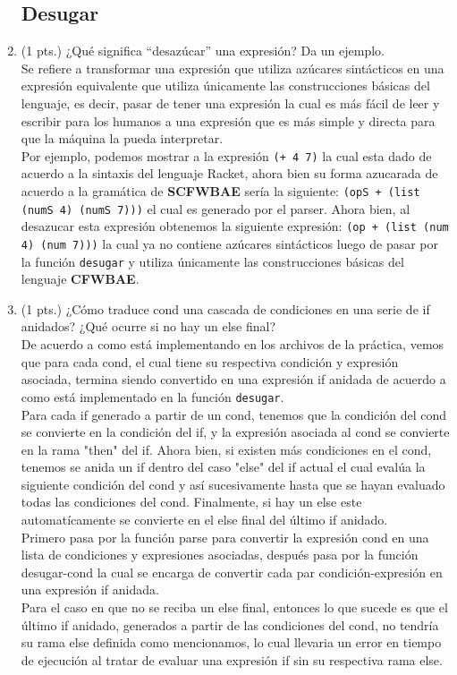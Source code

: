 \documentclass[11pt]{article}
\begin{document}
\begin{enumerate}
    \subsection{Desugar}
    \item (1 pts.) ¿Qué significa “desazúcar” una expresión? Da un ejemplo.\\
    Se refiere a transformar una expresión que utiliza azúcares sintácticos en una expresión equivalente que utiliza únicamente las construcciones básicas del lenguaje, es decir, pasar de tener una expresión la cual es más fácil de leer y escribir para los humanos a una expresión que es más simple y directa para que la máquina la pueda interpretar.\\
    Por ejemplo, podemos mostrar a la expresión \texttt{(+ 4 7)} la cual esta dado de acuerdo a la sintaxis del lenguaje Racket, ahora bien su forma azucarada de acuerdo a la gramática de \textbf{SCFWBAE} sería la siguiente: \texttt{(opS + (list (numS 4) (numS 7)))} el cual es generado por el parser. Ahora bien, al desazucar esta expresión obtenemos la siguiente expresión: \texttt{(op + (list (num 4) (num 7)))} la cual ya no contiene azúcares sintácticos luego de pasar por la función \texttt{desugar} y utiliza únicamente las construcciones básicas del lenguaje \textbf{CFWBAE}. 

    \item (1 pts.) ¿Cómo traduce cond una cascada de condiciones en una serie de if anidados? ¿Qué ocurre si no hay un else final?\\
    De acuerdo a como está implementando en los archivos de la práctica, vemos que para cada cond, el cual tiene su respectiva condición y expresión asociada, termina siendo convertido en una expresión if anidada de acuerdo a como está implementado en la función \texttt{desugar}.\\
    Para cada if generado a partir de un cond, tenemos que la condición del cond se convierte en la condición del if, y la expresión asociada al cond se convierte en la rama "then" del if. Ahora bien, si existen más condiciones en el cond, tenemos se anida un if dentro del caso "else" del if actual el cual evalúa la siguiente condición del cond y así sucesivamente hasta que se hayan evaluado todas las condiciones del cond. Finalmente, si hay un else este automatícamente se convierte en el else final del último if anidado.\\
    Primero pasa por la función parse para convertir la expresión cond en una lista de condiciones y expresiones asociadas, después pasa por la función desugar-cond la cual se encarga de convertir cada par condición-expresión en una expresión if anidada.\\
    Para el caso en que no se reciba un else final, entonces lo que sucede es que el último if anidado, generados a partir de las condiciones del cond, no tendría su rama else definida como mencionamos, lo cual llevaria un error en tiempo de ejecución al tratar de evaluar una expresión if sin su respectiva rama else.


\end{enumerate}
\end{document}
